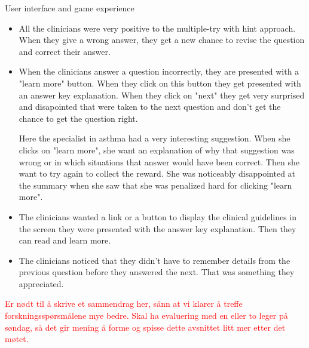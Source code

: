 User interface and game experience
 \begin{itemize}
 	\item All the clinicians were very positive to the multiple-try with hint approach. When they give a wrong answer, they get a new chance to revise the question and correct their answer.
 	\item When the clinicians answer a question incorrectly, they are presented with a "learn more" button. When they click on this button they get presented with an answer key explanation. When they click on "next" they get very surprised and disapointed that were taken to the next question and don't get the chance to get the question right.
 	
 	Here the specialist in asthma had a very interesting suggestion. When she clicks on "learn more", she want an explanation of why that suggestion was wrong or in which situations that answer would have been correct. Then she want to try again to collect the reward. She was noticeably disappointed at the summary when she saw that she was penalized hard for clicking "learn more".
 	\item The clinicians wanted a link or a button to display the clinical guidelines in the screen they were presented with the answer key explanation. Then they can read and learn more.
 	\item The clinicians noticed that they didn't have to remember details from the previous question before they answered the next. That was something they appreciated.
 	
\end{itemize}

\textcolor{red}{Er nødt til å skrive et sammendrag her, sånn at vi klarer å treffe forskningsspørsmålene mye bedre. Skal ha evaluering med en eller to leger på søndag, så det gir mening å forme og spisse dette avsnittet litt mer etter det møtet.}

